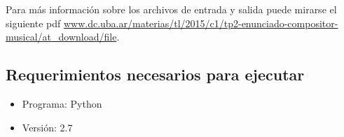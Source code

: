 Para más información sobre los archivos de entrada y salida puede mirarse el siguiente pdf \url{www.dc.uba.ar/materias/tl/2015/c1/tp2-enunciado-compositor-musical/at_download/file}.

\subsection{Requerimientos necesarios para ejecutar}
\begin{itemize}
\item Programa: Python
\item Versión: 2.7
\end{itemize}

